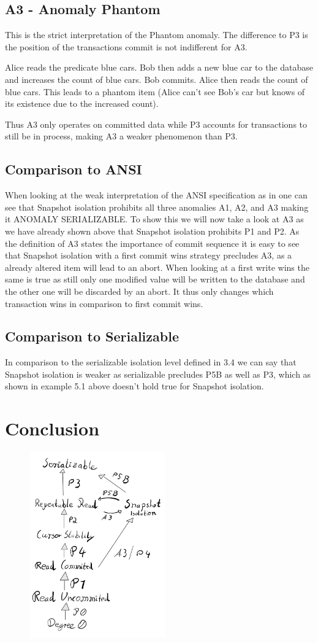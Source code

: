 \documentclass[sigconf, review=true]{acmart}
\begin{document}
\subsection{A3 - Anomaly Phantom}
This is the strict interpretation of the Phantom anomaly. The difference to P3 is the position of the
transactions commit is not indifferent for A3.
\begin{example}
    Alice reads the predicate blue cars. Bob then adds a new blue car to the database and increases
    the count of blue cars. Bob commits.  Alice then reads the count of blue cars. This leads to a phantom item
    (Alice can’t see Bob's car but knows of its existence due to the increased count).
\end{example}
Thus A3 only operates on committed data while P3 accounts for transactions to still be in process,
making A3 a weaker phenomenon than P3.
\subsection{Comparison to ANSI}
When looking at the weak interpretation of the ANSI specification as in \cite{Adya_Liskov_O_Neil_2000}
one can see that Snapshot isolation prohibits all three anomalies A1, A2, and A3 making it ANOMALY SERIALIZABLE.
To show this we will now take a look at A3 as we have already shown above that Snapshot isolation prohibits P1 and P2.
As the definition of A3 states the importance of commit sequence it is easy to see that Snapshot isolation with a first commit wins
strategy precludes A3, as a already altered item will lead to an abort.
When looking at a first write wins the same is true as still only one modified value will
be written to the database and the other one will be discarded by an abort. It thus only changes
which transaction wins in comparison to first commit wins.
\subsection{Comparison to Serializable}
In comparison to the serializable isolation level defined in 3.4 we can say that Snapshot isolation is
weaker as serializable precludes P5B as well as P3, which as shown in example 5.1 above doesn't hold true
for Snapshot isolation.
\section{Conclusion}
\includegraphics[width=8cm, height=8cm]{iso_lvl_dia.png}
\end{document}
